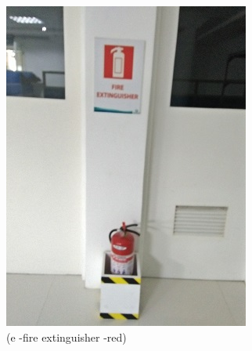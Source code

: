 \begin{figure}
\begin{minipage}[b]{0.22\linewidth}
	\includegraphics[width=\textwidth]{figures/R1P_safety/fireexting_checklisht.jpg}
	\caption*{(e -fire extinguisher -red)}
\end{minipage}
	\hspace{0.05cm}
\begin{minipage}[b]{0.22\linewidth}
	\centering

\end{minipage}
\end{figure}

